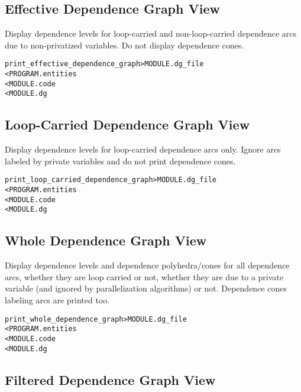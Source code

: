 \documentclass[a4paper]{report}
\newenvironment{PipsMake}{\begin{alltt}}{\end{alltt}}
\begin{document}
\subsection{Effective Dependence Graph View}

Display dependence levels for loop-carried and non-loop-carried dependence
arcs due to non-privatized variables. Do not display dependence cones.

\begin{PipsMake}
print_effective_dependence_graph          > MODULE.dg_file
        < PROGRAM.entities
        < MODULE.code
        < MODULE.dg
\end{PipsMake}

\subsection{Loop-Carried Dependence Graph View}

Display dependence levels for loop-carried dependence arcs only. Ignore
arcs labeled by private variables and do not print dependence cones.

\begin{PipsMake}
print_loop_carried_dependence_graph          > MODULE.dg_file
        < PROGRAM.entities
        < MODULE.code
        < MODULE.dg
\end{PipsMake}

\subsection{Whole Dependence Graph View}

Display dependence levels and dependence polyhedra/cones for all
dependence arcs, whether they are loop carried or not, whether they are
due to a private variable (and ignored by parallelization algorithms) or
not. Dependence cones labeling arcs are printed too.

\begin{PipsMake}
print_whole_dependence_graph          > MODULE.dg_file
        < PROGRAM.entities
        < MODULE.code
        < MODULE.dg
\end{PipsMake}

\subsection{Filtered Dependence Graph View}
\end{document}
